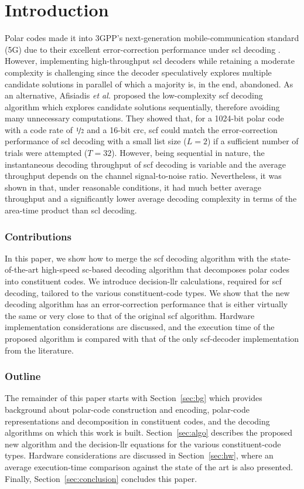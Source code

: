 \documentclass[conference]{IEEEtran}
\begin{document}
\section{Introduction}
\label{sec:intro}
Polar codes made it into 3GPP's next-generation mobile-communication standard (5G) due to their excellent error-correction performance under \gls{scl} decoding \cite{3GPPRANPolar}. However, implementing high-throughput \gls{scl} decoders while retaining a moderate complexity is challenging since the decoder speculatively explores multiple candidate solutions in parallel of which a majority is, in the end, abandoned. As an alternative, Afisiadis \textit{et al.} proposed the low-complexity \gls{scf} decoding algorithm \cite{Afisiadis2014} which explores candidate solutions sequentially, therefore avoiding many unnecessary computations. They showed that, for a 1024-bit polar code with a code rate of $\nicefrac{1}{2}$ and a 16-bit \gls{crc}, \gls{scf} could match the error-correction performance of \gls{scl} decoding with a small list size ($L=2$) if a sufficient number of trials were attempted ($T=32$). However, being sequential in nature, the instantaneous decoding throughput of \gls{scf} decoding is variable and the average throughput depends on the channel signal-to-noise ratio. Nevertheless, it was shown in \cite{Giard_JETCAS_2017} that, under reasonable conditions, it had much better average throughput and a significantly lower average decoding complexity in terms of the area-time product than \gls{scl} decoding.

\subsubsection*{Contributions}
In this paper, we show how to merge the \gls{scf} decoding algorithm with the state-of-the-art high-speed \gls{sc}-based decoding algorithm that decomposes polar codes into constituent codes. We introduce decision-\gls{llr} calculations, required for \gls{scf} decoding, tailored to the various constituent-code types. We show that the new decoding algorithm has an error-correction performance that is either virtually the same or very close to that of the original \gls{scf} algorithm. Hardware implementation considerations are discussed, and the execution time of the proposed algorithm is compared with that of the only \gls{scf}-decoder implementation from the literature.

\subsubsection*{Outline}
The remainder of this paper starts with Section~\ref{sec:bg} which provides background about polar-code construction and encoding, polar-code representations and decomposition in constituent codes, and the decoding algorithms on which this work is built.
Section~\ref{sec:algo} describes the proposed new algorithm and the decision-\gls{llr} equations for the various constituent-code types. Hardware considerations are discussed in Section~\ref{sec:hw}, where an average execution-time comparison against the state of the art is also presented. Finally, Section~\ref{sec:conclusion} concludes this paper.
\end{document}

